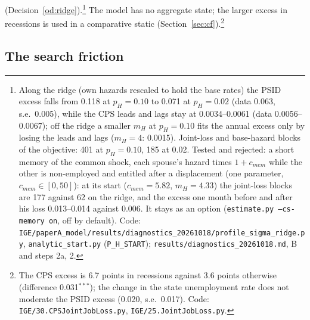\documentclass[11pt]{article}
\newcommand{\code}[1]{\texttt{#1}}
\newcommand{\1}{\mathbf{1}}
\begin{document}
(Decision~\ref{od:ridge}).\footnote{Along the ridge (own hazards rescaled to hold the base rates) the PSID excess falls
from 0.118 at $p_H = 0.10$ to 0.071 at $p_H = 0.02$ (data 0.063, s.e.\ 0.005), while the CPS leads and lags stay at
0.0034--0.0061 (data 0.0056--0.0067); off the ridge a smaller $m_H$ at $p_H = 0.10$ fits the annual excess only by
losing the leads and lags ($m_H = 4$: 0.0015). Joint-loss and base-hazard blocks of the objective: 401 at $p_H = 0.10$,
185 at 0.02. Tested and rejected: a short memory of the common shock, each spouse's hazard times $1 + c_{mem}$ while the
other is non-employed and entitled after a displacement (one parameter, $c_{mem} \in [0, 50]$): at its start
($c_{mem} = 5.82$, $m_H = 4.33$) the joint-loss blocks are 177 against 62 on the ridge, and the excess one month before
and after his loss 0.013--0.014 against 0.006. It stays as an option (\code{estimate.py --cs-memory on}, off by
default). Code: \code{IGE/paperA\_model/results/diagnostics\_20261018/profile\_sigma\_ridge.py},
\code{analytic\_start.py} (\code{P\_H\_START}); \code{results/diagnostics\_20261018.md}, B and steps 2a, 2.} The model
has no aggregate state; the larger excess in recessions is used in a comparative static (Section~\ref{sec:cf}).\footnote{The CPS excess is 6.7 points in recessions against 3.6 points
otherwise (difference 0.031$^{***}$); the change in the state unemployment rate does not moderate the PSID excess
(0.020, s.e.\ 0.017). Code: \code{IGE/30.CPSJointJobLoss.py}, \code{IGE/25.JointJobLoss.py}.}

\subsection{The search friction}
\end{document}
